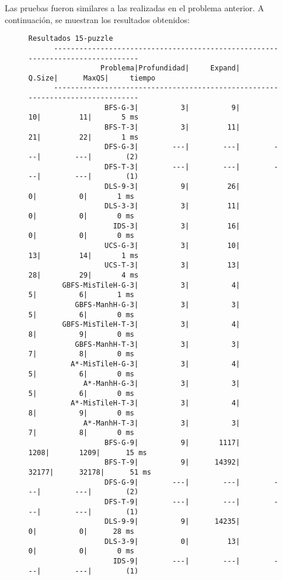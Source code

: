 \documentclass{article}
\begin{document}
Las pruebas fueron similares a las realizadas en el problema anterior. A continuación, se muestran los resultados obtenidos:
\begin{figure}[H]
\begin{Verbatim}[fontsize=\footnotesize]
      Resultados 15-puzzle
      -------------------------------------------------------------------------------
                 Problema|Profundidad|     Expand|     Q.Size|      MaxQS|     tiempo
      -------------------------------------------------------------------------------
                  BFS-G-3|          3|          9|         10|         11|       5 ms
                  BFS-T-3|          3|         11|         21|         22|       1 ms
                  DFS-G-3|        ---|        ---|        ---|        ---|        (2)
                  DFS-T-3|        ---|        ---|        ---|        ---|        (1)
                  DLS-9-3|          9|         26|          0|          0|       1 ms
                  DLS-3-3|          3|         11|          0|          0|       0 ms
                    IDS-3|          3|         16|          0|          0|       0 ms
                  UCS-G-3|          3|         10|         13|         14|       1 ms
                  UCS-T-3|          3|         13|         28|         29|       4 ms
        GBFS-MisTileH-G-3|          3|          4|          5|          6|       1 ms
           GBFS-ManhH-G-3|          3|          3|          5|          6|       0 ms
        GBFS-MisTileH-T-3|          3|          4|          8|          9|       0 ms
           GBFS-ManhH-T-3|          3|          3|          7|          8|       0 ms
          A*-MisTileH-G-3|          3|          4|          5|          6|       0 ms
             A*-ManhH-G-3|          3|          3|          5|          6|       0 ms
          A*-MisTileH-T-3|          3|          4|          8|          9|       0 ms
             A*-ManhH-T-3|          3|          3|          7|          8|       0 ms
                  BFS-G-9|          9|       1117|       1208|       1209|      15 ms
                  BFS-T-9|          9|      14392|      32177|      32178|      51 ms
                  DFS-G-9|        ---|        ---|        ---|        ---|        (2)
                  DFS-T-9|        ---|        ---|        ---|        ---|        (1)
                  DLS-9-9|          9|      14235|          0|          0|      28 ms
                  DLS-3-9|          0|         13|          0|          0|       0 ms
                    IDS-9|        ---|        ---|        ---|        ---|        (1)

\end{Verbatim}
\end{figure}
\end{document}
